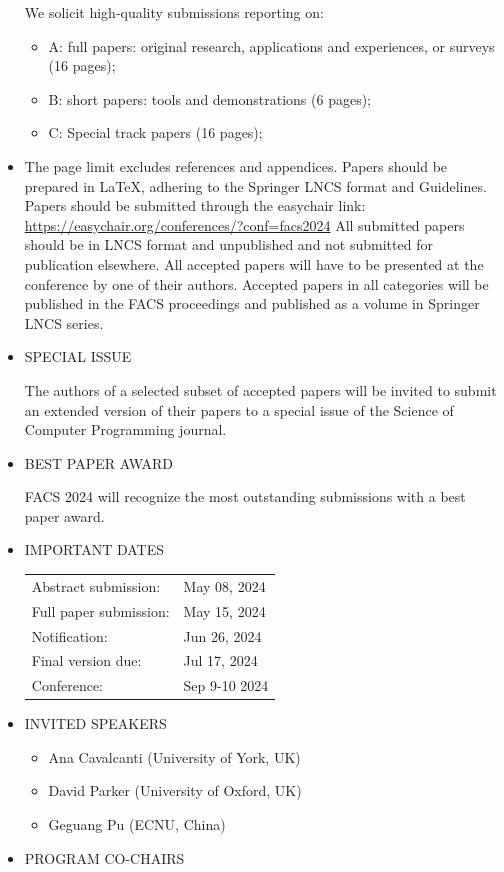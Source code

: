 \documentclass[prodmode,acmtecs]{acmsmall} %
\begin{document}
\begin{itemize}
  We solicit high-quality submissions reporting on: 
 
\begin{itemize}\item  A: full papers: original research, applications and experiences, or surveys (16 pages);
\item  B: short papers: tools and demonstrations (6 pages);
\item  C: Special track papers (16 pages);
\end{itemize} 
\item  The page limit excludes references and appendices. Papers should be prepared in LaTeX, adhering to the Springer LNCS format and Guidelines. Papers should be submitted through the easychair link: \href{https://easychair.org/conferences/?conf=facs2024}{https://easychair.org/conferences/?conf=facs2024} All submitted papers should be in LNCS format and unpublished and not submitted for publication elsewhere. All accepted papers will have to be presented at the conference by one of their authors. Accepted papers in all categories will be published in the FACS proceedings and published as a volume in Springer LNCS series. 
 
\item  SPECIAL ISSUE  
 
  The authors of a selected subset of accepted papers will be invited to submit an extended version of their papers to a special issue of the Science of Computer Programming journal. 
 
\item  BEST PAPER AWARD 
 
  FACS 2024 will recognize the most outstanding submissions with a best paper award. 
 
\item  IMPORTANT DATES 
 
\begin{tabulary}{\linewidth}{LL}Abstract submission:  & May 08, 2024 \\
Full paper submission:  & May 15, 2024 \\
Notification:  & Jun 26, 2024 \\
Final version due:  & Jul 17, 2024 \\
Conference:  & Sep 9-10 2024 \\
\end{tabulary}
 
\item  INVITED SPEAKERS 
 
\begin{itemize}\item  Ana Cavalcanti (University of York, UK)
\item  David Parker (University of Oxford, UK)
\item Geguang Pu (ECNU, China)
\end{itemize} 
\item  PROGRAM CO-CHAIRS 
 

\end{itemize}
\end{document}
